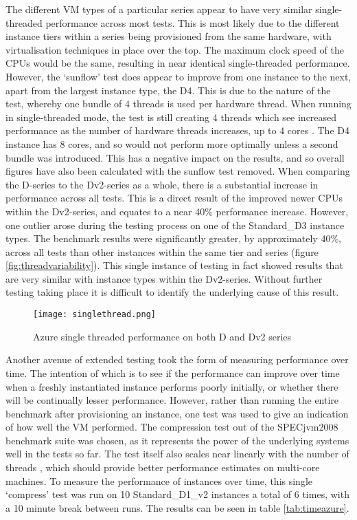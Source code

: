 \documentclass{llncs}
\begin{document}
The different VM types of a particular series appear to have very similar single-threaded performance across most tests. This is most likely due to the different instance tiers within a series being provisioned from the same hardware, with virtualisation techniques in place over the top. The maximum clock speed of the CPUs would be the same, resulting in near identical single-threaded performance. However, the `sunflow' test does appear to improve from one instance to the next, apart from the largest instance type, the D4. This is due to the nature of the test, whereby one bundle of 4 threads is used per hardware thread. When running in single-threaded mode, the test is still creating 4 threads which see increased performance as the number of hardware threads increases, up to 4 cores \cite{shiv2009specjvm2008}. The D4 instance has 8 cores, and so would not perform more optimally unless a second bundle was introduced. This has a negative impact on the results, and so overall figures have also been calculated with the sunflow test removed. When comparing the D-series to the Dv2-series as a whole, there is a substantial increase in performance across all tests. This is a direct result of the improved newer CPUs within the Dv2-series, and equates to a near 40\% performance increase. However, one outlier arose during the testing process on one of the Standard\_D3 instance types. The benchmark results were significantly greater, by approximately 40\%, across all tests than other instances within the same tier and series (figure \ref{fig:threadvariability}). This single instance of testing in fact showed results that are very similar with instance types within the Dv2-series. Without further testing taking place it is difficult to identify the underlying cause of this result.

\begin{figure}[ht]
  \centering
  \texttt{[image: singlethread.png]}
  \caption{Azure single threaded performance on both D and Dv2 series}
  \label{fig:threadchart}
\end{figure}

Another avenue of extended testing took the form of measuring performance over time. The intention of which is to see if the performance can improve over time when a freshly instantiated instance performs poorly initially, or whether there will be continually lesser performance. However, rather than running the entire benchmark after provisioning an instance, one test was used to give an indication of how well the VM performed. The compression test out of the SPECjvm2008 benchmark suite was chosen, as it represents the power of the underlying systems well in the tests so far. The test itself also scales near linearly with the number of threads \cite{shiv2009specjvm2008}, which should provide better performance estimates on multi-core machines. To measure the performance of instances over time, this single `compress' test was run on 10 Standard\_D1\_v2 instances a total of 6 times, with a 10 minute break between runs. The results can be seen in table \ref{tab:timeazure}.
\end{document}
